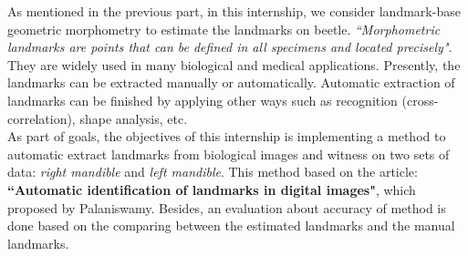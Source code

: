 As mentioned in the previous part, in this internship, we consider landmark-base geometric morphometry to estimate the landmarks on beetle. \textit{``Morphometric landmarks are points that can be defined in all specimens  and located precisely"}\cite{palaniswamy2010automatic}. They are widely used in many biological and medical applications. Presently, the landmarks can be extracted manually or automatically. Automatic extraction of landmarks can be finished by applying other ways such as recognition (cross-correlation), shape analysis, etc.\\[0.2cm]
As part of goals, the objectives of this internship is implementing a method to automatic extract landmarks from biological images and witness on two sets of data: \textit{right mandible} and \textit{left mandible}. This method based on the article: \textbf{``Automatic identification of landmarks in digital images"}, which proposed by Palaniswamy\cite{palaniswamy2010automatic}. Besides, an evaluation about accuracy of method is done based on the comparing between the estimated landmarks and the manual landmarks.






























